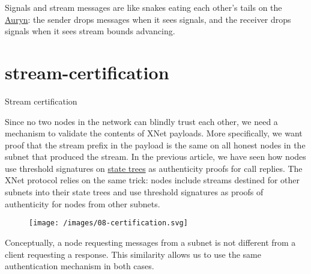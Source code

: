 \documentclass{article}
\begin{document}
Signals and stream messages are like snakes eating each other's tails on the \href{https://theneverendingstory.fandom.com/wiki/Auryn}{Auryn}: the sender drops messages when it sees signals, and the receiver drops signals when it sees stream bounds advancing.

\section{stream-certification}{Stream certification}

Since no two nodes in the network can blindly trust each other, we need a mechanism to validate the contents of XNet payloads.
More specifically, we want proof that the stream prefix in the payload is the same on all honest nodes in the subnet that produced the stream.
In the previous article, we have seen how nodes use threshold signatures on \href{/posts/02-ic-state-machine-replication.html#state-trees}{state trees} as authenticity proofs for call replies.
The XNet protocol relies on the same trick: nodes include streams destined for other subnets into their state trees and use threshold signatures as proofs of authenticity for nodes from other subnets.

\begin{figure}[grayscale-diagram]
  \texttt{[image: /images/08-certification.svg]}
\end{figure}

Conceptually, a node requesting messages from a subnet is not different from a client requesting a response.
This similarity allows us to use the same authentication mechanism in both cases.
\end{document}
